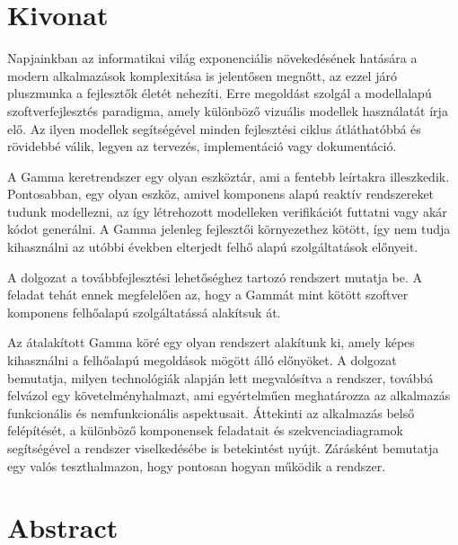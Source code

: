 \setcounter{page}{1}

\selecthungarian

\chapter*{Kivonat}
Napjainkban az informatikai világ exponenciális növekedésének hatására a modern alkalmazások komplexitása is jelentősen megnőtt, az ezzel járó pluszmunka a fejlesztők életét nehezíti. Erre megoldást szolgál a modellalapú szoftverfejlesztés paradigma, amely különböző vizuális modellek használatát írja elő. Az ilyen modellek segítségével minden fejlesztési ciklus átláthatóbbá és rövidebbé válik, legyen az tervezés, implementáció vagy dokumentáció.

A Gamma keretrendszer egy olyan eszköztár, ami a fentebb leírtakra illeszkedik. Pontosabban, egy olyan eszköz, amivel komponens alapú reaktív rendszereket tudunk modellezni, az így létrehozott modelleken verifikációt futtatni vagy akár kódot generálni. A Gamma jelenleg fejlesztői környezethez kötött, így nem tudja kihasználni az utóbbi években elterjedt felhő alapú szolgáltatások előnyeit.

A dolgozat a továbbfejlesztési lehetőséghez tartozó rendszert mutatja be. A feladat tehát ennek megfelelően az, hogy a Gammát mint kötött szoftver komponens felhőalapú szolgáltatássá alakítsuk át.

Az átalakított Gamma köré egy olyan rendszert alakítunk ki, amely képes kihasználni a felhőalapú megoldások mögött álló előnyöket. A dolgozat bemutatja, milyen technológiák alapján lett megvalósítva a rendszer, továbbá felvázol egy követelményhalmazt, ami egyértelműen meghatározza az alkalmazás funkcionális és nemfunkcionális aspektusait. Áttekinti az alkalmazás belső felépítését, a különböző komponensek feladatait és szekvenciadiagramok segítségével a rendszer viselkedésébe is betekintést nyújt. Zárásként bemutatja egy valós teszthalmazon, hogy pontosan hogyan működik a rendszer.

\vfill
\selectenglish


\chapter*{Abstract}

